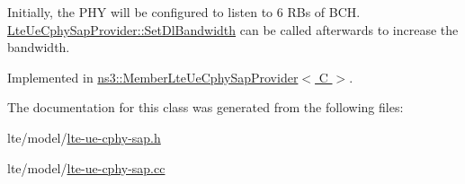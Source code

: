 Initially, the P\+HY will be configured to listen to 6 R\+Bs of B\+CH. \hyperlink{classns3_1_1LteUeCphySapProvider_a6b77b03695f82cd342c2462c9fe12e85}{Lte\+Ue\+Cphy\+Sap\+Provider\+::\+Set\+Dl\+Bandwidth} can be called afterwards to increase the bandwidth. 

Implemented in \hyperlink{classns3_1_1MemberLteUeCphySapProvider_abb7d1c5863a0800122e00ad629dd83da}{ns3\+::\+Member\+Lte\+Ue\+Cphy\+Sap\+Provider$<$ C $>$}.



The documentation for this class was generated from the following files\+:\begin{DoxyCompactItemize}
\item 
lte/model/\hyperlink{lte-ue-cphy-sap_8h}{lte-\/ue-\/cphy-\/sap.\+h}\item 
lte/model/\hyperlink{lte-ue-cphy-sap_8cc}{lte-\/ue-\/cphy-\/sap.\+cc}\end{DoxyCompactItemize}
